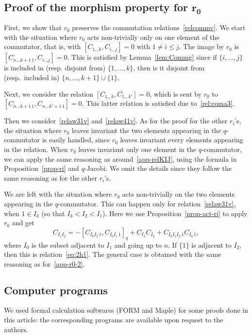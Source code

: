 \documentclass[pdftex]{sigma}
\numberwithin{equation}{section}
\theoremstyle{definition}
\begin{document}
\subsection[Proof of the morphism property for r\_0]{Proof of the morphism property for $\boldsymbol{r_0}$} First, we show that $r_0$ preserves the commutation relations~\eqref{relcommv}. We start with the situation where $r_0$ acts non-trivially only on one element of the commutator, that is, with ${[C_{1\dots k},C_{i\dots j}]=0}$ with $1\neq i\leq j$. The image by $r_0$ is ${[C_{n\dots k+1\, 1},C_{i\dots j}]=0}$. This is satisfied by Lemma~\ref{lem:Commg} since if $\{i,\dots,j\}$ is included in (resp. disjoint from) $\{1,\dots,k\}$, then is it disjoint from (resp.\ included in) $\{n,\dots,k+1\}\cup\{1\}$.

Next, we consider the relation $[C_{1\dots k},\!C_{1\dots k'}]\!=\!0$, which is sent by $r_0$ to ${[C_{n\dots k+1\,1},\!C_{n\dots k'+1\,1}]\!=\!0}$. This latter relation is satisfied due to~\eqref{rel:coma3}.

Then we consider~\eqref{relaw31v} and~\eqref{relaw41v}. As for the proof for the other $r_i$'s, the situation where $r_0$ leaves invariant the two elements appearing in the $q$-commutator is easily handled, since $r_0$ leaves invariant every elements appearing in the relation. When $r_0$ leaves invariant only one element in the $q$-commutator, we can apply the same reasoning as around~\eqref{app-relKIJ}, using the formula in Proposition~\ref{prop-ri} and $q$-Jacobi. We omit the details since they follow the same reasoning as for the other $r_i$'s.

We are left with the situation where $r_0$ acts non-trivially on the two elements appearing in the $q$-commutator. This can happen only for relation~\eqref{relaw31v}, when $1\in I_3$ (so that $I_3<I_2<I_1$). Here we use Proposition~\ref{prop-act-ri} to apply $r_0$ and get
\[C_{I_1I_2}=-[C_{I_0I_2\,1},C_{I_0I_1\,1}]_q+C_{I_1}C_{I_2}+C_{I_0I_1I_2\,1}C_{I_0\,1} ,\]
where $I_0$ is the subset adjacent to $I_1$ and going up to $n$. If $\{1\}$ is adjacent to $I_2$, then this is relation~\eqref{eq:2h1}. The general case is obtained with the same reasoning as for~\eqref{app-r0-2}.

\subsection*{Computer programs}
We used formal calculation softwares (FORM and Maple) for some proofs done in this article: the corresponding programs are available upon request to the authors.
\end{document}
